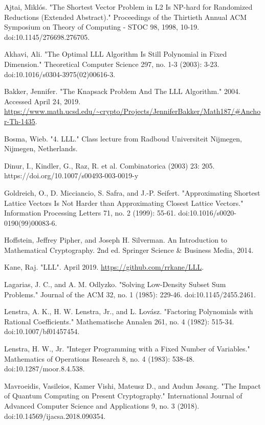 \documentclass[a4paper,12pt]{article}
\begin{document}
\begin{thebibliography}{99}

 Ajtai, Miklós. "The Shortest Vector Problem in L2 Is NP-hard for Randomized Reductions (Extended Abstract)." Proceedings of the Thirtieth Annual ACM Symposium on Theory of Computing - STOC 98, 1998, 10-19. doi:10.1145/276698.276705.

 Akhavi, Ali. "The Optimal LLL Algorithm Is Still Polynomial in Fixed Dimension." Theoretical Computer Science 297, no. 1-3 (2003): 3-23. doi:10.1016/s0304-3975(02)00616-3.

 Bakker, Jennifer. "The Knapsack Problem And The LLL Algorithm." 2004. Accessed April 24, 2019. \url{https://www.math.ucsd.edu/~crypto/Projects/JenniferBakker/Math187/\#Anchor-Th-1435}.

 Bosma, Wieb. "4. LLL." Class lecture from Radboud Universiteit Nijmegen, Nijmegen, Netherlands.

 Dinur, I., Kindler, G., Raz, R. et al. Combinatorica (2003) 23: 205. https://doi.org/10.1007/s00493-003-0019-y

 Goldreich, O., D. Micciancio, S. Safra, and J.-P. Seifert. "Approximating Shortest Lattice Vectors Is Not Harder than Approximating Closest Lattice Vectors." Information Processing Letters 71, no. 2 (1999): 55-61. doi:10.1016/s0020-0190(99)00083-6.

 Hoffstein, Jeffrey Pipher, and Joseph H. Silverman. An Introduction to Mathematical Cryptography. 2nd ed. Springer Science \& Business Media, 2014.

 Kane, Raj. "LLL". April 2019. \url{https://github.com/rrkane/LLL}.

 Lagarias, J. C., and A. M. Odlyzko. "Solving Low-Density Subset Sum Problems." Journal of the ACM 32, no. 1 (1985): 229-46. doi:10.1145/2455.2461.

 Lenstra, A. K., H. W. Lenstra, Jr., and L. Lov\'asz. "Factoring Polynomials with Rational Coefficients." Mathematische Annalen 261, no. 4 (1982): 515-34. doi:10.1007/bf01457454.

 Lenstra, H. W., Jr. "Integer Programming with a Fixed Number of Variables." Mathematics of Operations Research 8, no. 4 (1983): 538-48. doi:10.1287/moor.8.4.538.

 Mavroeidis, Vasileios, Kamer Vishi, Mateusz D., and Audun Jøsang. "The Impact of Quantum Computing on Present Cryptography." International Journal of Advanced Computer Science and Applications 9, no. 3 (2018). doi:10.14569/ijacsa.2018.090354.


\end{thebibliography}
\end{document}
